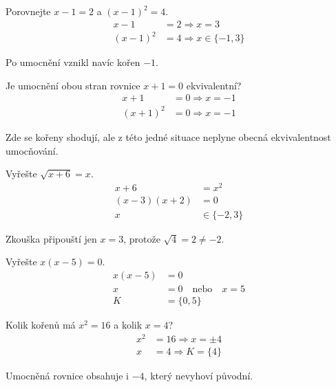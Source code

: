 \documentclass[11pt,a4paper]{article}
\begin{document}
\begin{zadaniReseniBox}[title={Úloha 3}]
Porovnejte $x-1=2$ a $(x-1)^2=4$.
\tcblower
\begin{align*}
x-1&=2\Rightarrow x=3 \\
 (x-1)^2&=4\Rightarrow x\in\{-1,3\}
\end{align*}

Po umocnění vznikl navíc kořen $-1$.
\end{zadaniReseniBox}
\begin{zadaniReseniBox}[title={Úloha 1}]
Je umocnění obou stran rovnice $x+1=0$ ekvivalentní?
\tcblower
\begin{align*}
x+1&=0\Rightarrow x=-1 \\
 (x+1)^2&=0\Rightarrow x=-1
\end{align*}

Zde se kořeny shodují, ale z této jedné situace neplyne obecná ekvivalentnost umocňování.
\end{zadaniReseniBox}
\begin{zadaniReseniBox}[title={Úloha 1}]
Vyřešte $\sqrt{x+6}=x$.
\tcblower
\begin{align*}
x+6&=x^2 \\
 (x-3)(x+2)&=0 \\
 x&\in\{-2,3\}
\end{align*}

Zkouška připouští jen $x=3$, protože $\sqrt4=2\ne-2$.
\end{zadaniReseniBox}
\begin{zadaniReseniBox}[title={Úloha 2}]
Vyřešte $x(x-5)=0$.
\tcblower
\begin{align*}
x(x-5)&=0 \\
 x&=0\quad\text{nebo}\quad x=5 \\
 K&=\{0,5\}
\end{align*}
\end{zadaniReseniBox}
\begin{zadaniReseniBox}[title={Úloha 3}]
Kolik kořenů má $x^2=16$ a kolik $x=4$?
\tcblower
\begin{align*}
x^2&=16\Rightarrow x=\pm4 \\
 x&=4\Rightarrow K=\{4\}
\end{align*}

Umocněná rovnice obsahuje i $-4$, který nevyhoví původní.
\end{zadaniReseniBox}
\end{document}
